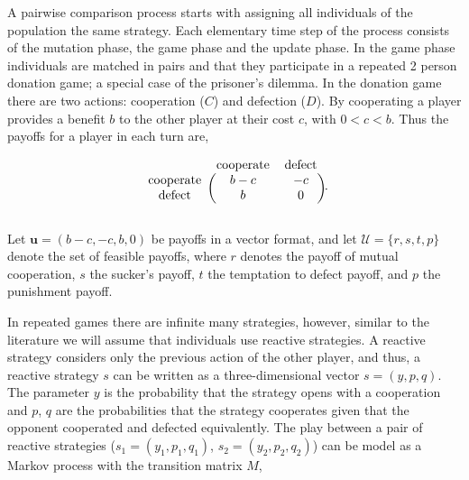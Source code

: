 \documentclass[11pt]{article}
\theoremstyle{plainCl1}
\theoremstyle{plainCl2}
\begin{document}
A pairwise comparison process starts with assigning all
individuals of the population the same strategy. Each elementary time step of
the process consists of the mutation phase, the game phase and the update phase.
In the game phase individuals are matched in pairs and that they participate in
a repeated 2 person donation game; a special case of the prisoner's dilemma. In
the donation game there are two actions: cooperation (\(C\)) and defection
(\(D\)). By cooperating a player provides a benefit \(b\) to the other player at
their cost \(c\), with \(0 < c < b\). Thus the payoffs for a player in each turn
are,

\begin{equation}
    \begin{blockarray}{ccc}
        & \text{cooperate} & \text{defect} \\
        \begin{block}{c(cc)}
            \text{cooperate} & b - c & -c \\
            \text{defect} & b & 0 \\
        \end{block}
    \end{blockarray}.
\end{equation}

Let \(\mathbf{u} = (b-c, -c, b, 0)\) be payoffs in a vector format, and let
\(\mathcal{U} = \{r, s, t, p\}\) denote the set of feasible payoffs, where \(r\)
denotes the payoff of mutual cooperation, \(s\) the sucker's payoff, \(t\) the
temptation to defect payoff, and \(p\) the punishment payoff.

In repeated games there are infinite many strategies, however, similar to the
literature we will assume that individuals use reactive strategies. A reactive
strategy considers only the previous action of the other player, and thus, a
reactive strategy \(s\) can be written as a three-dimensional vector \(s=(y, p,
q)\). The parameter \(y\) is the probability that the strategy opens with a
cooperation and \(p\), \(q\) are the probabilities that the strategy cooperates
given that the opponent cooperated and defected equivalently. The play between a
pair of reactive strategies ($s_1 = (y_1, p_1, q_1)$, $s_2 = (y_2, p_2, q_2)$)
can be model as a Markov process with the transition matrix \(M\),

\begin{equation}\label{eq:transition_matrix}
  
\end{equation}
\end{document}
